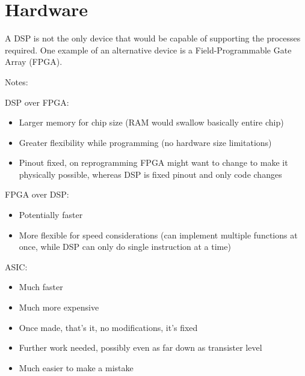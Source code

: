\section{Hardware}
A DSP is not the only device that would be capable of supporting the processes required. One example of an alternative device is a Field-Programmable Gate Array (FPGA).

Notes:

DSP over FPGA:
\begin{itemize}
\item Larger memory for chip size (RAM would swallow basically entire chip)
\item Greater flexibility while programming (no hardware size limitations)
\item Pinout fixed, on reprogramming FPGA might want to change to make it physically possible, whereas DSP is fixed pinout and only code changes
\end{itemize}

FPGA over DSP:
\begin{itemize}
\item Potentially faster
\item More flexible for speed considerations (can implement multiple functions at once, while DSP can only do single instruction at a time)
\end{itemize}

ASIC:
\begin{itemize}
\item Much faster
\item Much more expensive
\item Once made, that's it, no modifications, it's fixed
\item Further work needed, possibly even as far down as transister level
\item Much easier to make a mistake
\end{itemize}
